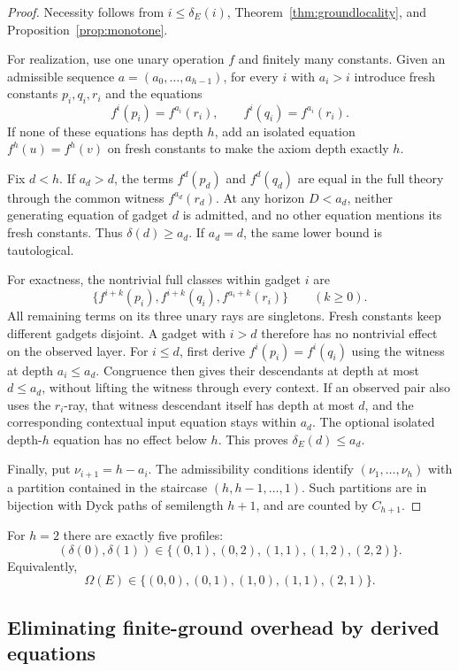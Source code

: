 \begin{proof}
Necessity follows from $i\le\delta_E(i)$, Theorem~\ref{thm:groundlocality}, and Proposition~\ref{prop:monotone}.

For realization, use one unary operation $f$ and finitely many constants.  Given an admissible sequence $a=(a_0,\ldots,a_{h-1})$, for every $i$ with $a_i>i$ introduce fresh constants $p_i,q_i,r_i$ and the equations
\begin{equation}\label{eq:gadget}
f^i(p_i)=f^{a_i}(r_i),\qquad
f^i(q_i)=f^{a_i}(r_i).
\end{equation}
If none of these equations has depth $h$, add an isolated equation $f^h(u)=f^h(v)$ on fresh constants to make the axiom depth exactly $h$.

Fix $d<h$.  If $a_d>d$, the terms $f^d(p_d)$ and $f^d(q_d)$ are equal in the full theory through the common witness $f^{a_d}(r_d)$.  At any horizon $D<a_d$, neither generating equation of gadget $d$ is admitted, and no other equation mentions its fresh constants.  Thus $\delta(d)\ge a_d$.  If $a_d=d$, the same lower bound is tautological.

For exactness, the nontrivial full classes within gadget $i$ are
\[
\{f^{i+k}(p_i),f^{i+k}(q_i),f^{a_i+k}(r_i)\}
\qquad(k\ge0).
\]
All remaining terms on its three unary rays are singletons. Fresh constants
keep different gadgets disjoint. A gadget with $i>d$ therefore has no
nontrivial effect on the observed layer. For $i\le d$, first derive
$f^i(p_i)=f^i(q_i)$ using the witness at depth $a_i\le a_d$.
Congruence then gives their descendants at depth at most $d\le a_d$,
without lifting the witness through every context. If an observed pair
also uses the $r_i$-ray, that witness descendant itself has depth at most
$d$, and the corresponding contextual input equation stays within $a_d$.
The optional isolated depth-$h$ equation has no effect below $h$.
This proves $\delta_E(d)\le a_d$.

Finally, put $\nu_{i+1}=h-a_i$.  The admissibility conditions identify $(\nu_1,\ldots,\nu_h)$ with a partition contained in the staircase $(h,h-1,\ldots,1)$.  Such partitions are in bijection with Dyck paths of semilength $h+1$, and are counted by $C_{h+1}$.
\end{proof}

For $h=2$ there are exactly five profiles:
\[
(\delta(0),\delta(1))
\in
\{(0,1),(0,2),(1,1),(1,2),(2,2)\}.
\]
Equivalently,
\[
\Omega(E)
\in
\{(0,0),(0,1),(1,0),(1,1),(2,1)\}.
\]


\subsection{Eliminating finite-ground overhead by derived equations}

